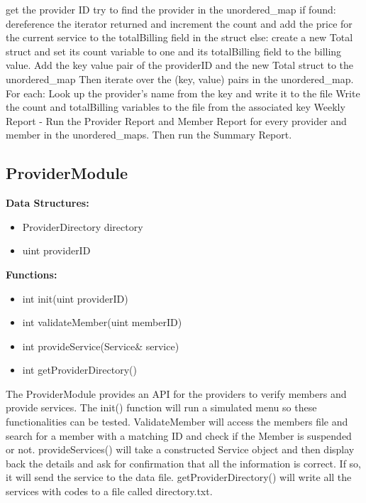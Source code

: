 \documentclass{article}
\begin{document}
get the provider ID
try to find the provider in the unordered_map
if found: dereference the iterator returned and increment the count and add the price for the current service to the totalBilling field in the struct
else: create a new Total struct and set its count variable to one and its totalBilling field to the billing value. Add the key value pair of the providerID and the new Total struct to the unordered_map
    Then iterate over the (key, value) pairs in the unordered_map. For each:
Look up the provider’s name from the key and write it to the file
Write the count and totalBilling variables to the file from the associated key
Weekly Report - Run the Provider Report and Member Report for every provider and member in the unordered_maps. Then run the Summary Report.

\subsection{ProviderModule}
\textbf{Data Structures:}
\begin{itemize}
   \item ProviderDirectory directory
   \item uint providerID
\end{itemize}
\textbf{Functions:}
\begin{itemize}
   \item int init(uint providerID)
   \item int validateMember(uint memberID)
   \item int provideService(Service\& service)
   \item int getProviderDirectory()
\end{itemize}
The ProviderModule provides an API for the providers to verify members and provide services. The init() function will run a simulated menu so these functionalities can be tested. ValidateMember will access the members file and search for a member with a matching ID and check if the Member is suspended or not. provideServices() will take a constructed Service object and then display back the details and ask for confirmation that all the information is correct. If so, it will send the service to the data file. getProviderDirectory() will write all the services with codes to a file called directory.txt.
\end{document}
